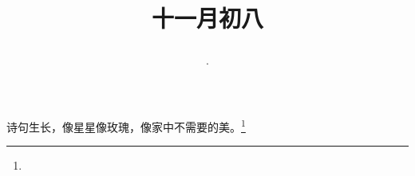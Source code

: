\title{\date[d=8,m=12,y=2024][year:cn-y,年,month:cn,day:cn,日,·,weekday]·十一月初八 }
诗句生长，像星星像玫瑰，像家中不需要的美。\footnote{ }

